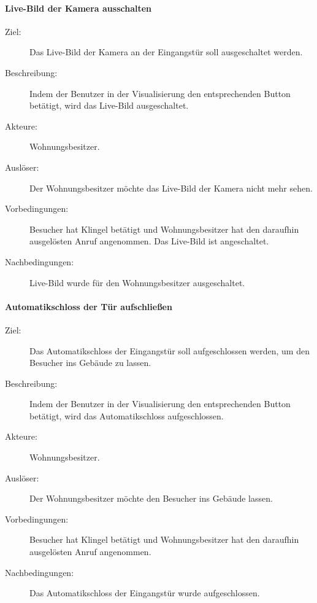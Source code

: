 \paragraph{Live-Bild der Kamera ausschalten}
    \begin{description}
        \item[Ziel:] Das Live-Bild der Kamera an der Eingangstür soll ausgeschaltet werden.
        \item[Beschreibung:] Indem der Benutzer in der Visualisierung den entsprechenden Button betätigt, wird das Live-Bild ausgeschaltet.
        \item[Akteure:] Wohnungsbesitzer.
        \item[Auslöser:] Der Wohnungsbesitzer möchte das Live-Bild der Kamera nicht mehr sehen.
        \item[Vorbedingungen:] Besucher hat Klingel betätigt und Wohnungsbesitzer hat den daraufhin ausgelösten Anruf angenommen.
            Das Live-Bild ist angeschaltet.
        \item[Nachbedingungen:] Live-Bild wurde für den Wohnungsbesitzer ausgeschaltet.
    \end{description}

\paragraph{Automatikschloss der Tür aufschließen}
    \begin{description}
        \item[Ziel:] Das Automatikschloss der Eingangstür soll aufgeschlossen werden, um den Besucher ins Gebäude zu lassen.
        \item[Beschreibung:] Indem der Benutzer in der Visualisierung den entsprechenden Button betätigt, wird das Automatikschloss aufgeschlossen.
        \item[Akteure:] Wohnungsbesitzer.
        \item[Auslöser:] Der Wohnungsbesitzer möchte den Besucher ins Gebäude lassen.
        \item[Vorbedingungen:] Besucher hat Klingel betätigt und Wohnungsbesitzer hat den daraufhin ausgelösten Anruf angenommen.
        \item[Nachbedingungen:] Das Automatikschloss der Eingangstür wurde aufgeschlossen.
    \end{description}

